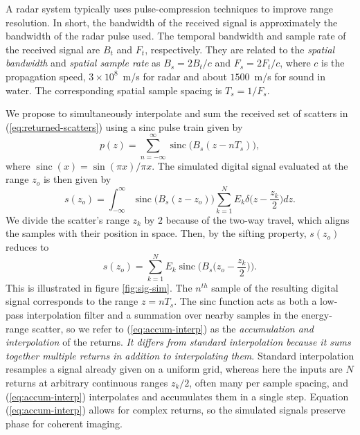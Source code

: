\documentclass[sensors,article,submit,moreauthors]{Definitions/mdpi}
\DeclareMathOperator{\sinc}{sinc}
\begin{document}
A radar system typically uses pulse-compression techniques to improve range resolution. In short, the bandwidth of the received signal is approximately the bandwidth of the radar pulse used. The temporal bandwidth and sample rate of the received signal are $B_t$ and $F_t$, respectively. They are related to the \emph{spatial bandwidth} and \emph{spatial sample rate} as $B_s = 2B_t/c$ and $F_s = 2F_t/c$, where $c$ is the propagation speed, $3\times10^8$~m/s for radar and about $1500$~m/s for sound in water. The corresponding spatial sample spacing is $T_s = 1/F_s$.

We propose to simultaneously interpolate and sum the received set of scatters in (\ref{eq:returned-scatters}) using a sinc pulse train given by
\begin{equation}
    p(z) = \sum_{n=-\infty}^{\infty}\sinc\big(B_s(z-nT_s)\big)
    ,
\end{equation}
where $\sinc(x) = \sin(\pi x)/\pi x$. The simulated digital signal evaluated at the range $z_o$ is then given by
\begin{equation}
    s(z_o) =
    \int_{-\infty}^{\infty}\sinc\big(B_s(z-z_o)\big)\sum_{k=1}^{N}E_k\delta
    \bigg(z-\frac{z_k}{2} \bigg) dz
    .
\end{equation}
We divide the scatter's range $z_k$ by $2$ because of the two-way travel, which aligns the samples with their position in space. Then, by the sifting property, $s(z_o)$ reduces to
\begin{equation}
    s(z_o) = \sum_{k=1}^{N}E_k\sinc\Bigg(B_s\bigg(z_o-\frac{z_k}{2}\bigg)\Bigg)
    .
    \label{eq:accum-interp}
\end{equation}
This is illustrated in figure \ref{fig:sig-sim}. The $n^{th}$ sample of the resulting digital signal corresponds to the range $z=nT_s$. The sinc function acts as both a low-pass interpolation filter and a summation over nearby samples in the energy-range scatter, so we refer to (\ref{eq:accum-interp}) as the \emph{accumulation and interpolation} of the returns. \emph{It differs from standard interpolation because it sums together multiple returns in addition to interpolating them}. Standard interpolation resamples a signal already given on a uniform grid, whereas here the inputs are $N$ returns at arbitrary continuous ranges $z_k/2$, often many per sample spacing, and (\ref{eq:accum-interp}) interpolates and accumulates them in a single step.  Equation (\ref{eq:accum-interp}) allows for complex returns, so the simulated signals preserve phase for coherent imaging.
\end{document}
